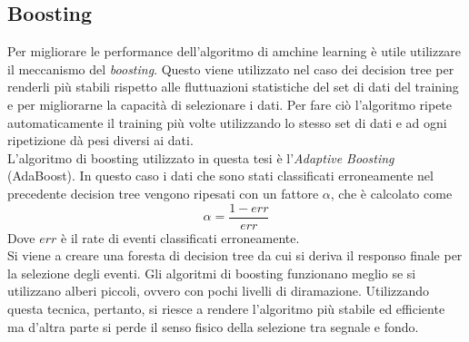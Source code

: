     \subsection{Boosting} \label{Boosting}
    Per migliorare le performance dell'algoritmo di amchine learning \`e utile utilizzare il meccanismo del \textit{boosting}. Questo viene utilizzato nel caso dei decision tree per renderli più stabili rispetto alle fluttuazioni statistiche del set di dati del training e per migliorarne la capacit\`a di selezionare i dati. Per fare ciò l'algoritmo ripete automaticamente il training pi\`u volte utilizzando lo stesso set di dati e ad ogni ripetizione d\`a pesi diversi ai dati.
    \\L'algoritmo di boosting utilizzato in questa tesi è l'\textit{Adaptive Boosting} (AdaBoost). In questo caso i dati che sono stati classificati erroneamente nel precedente decision tree vengono ripesati con un fattore $\alpha$, che è calcolato come 
        \begin{equation}
            \alpha = \frac{1 - err}{err}
        \end{equation}
    Dove $err$ è il rate di eventi classificati erroneamente. 
    \\Si viene a creare una foresta di decision tree da cui si deriva il responso finale per la selezione degli eventi. Gli algoritmi di boosting funzionano meglio se si utilizzano alberi piccoli, ovvero con pochi livelli di diramazione.
    Utilizzando questa tecnica, pertanto, si riesce a rendere l'algoritmo più stabile ed efficiente ma d'altra parte si perde il senso fisico della selezione tra segnale e fondo. 
    
    
    
    
